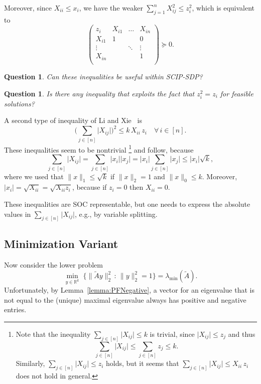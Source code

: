 \documentclass[10pt, a4paper]{article}
\newcommand{\suchthat}{\,:\,}
\newcommand{\abs}[1]{\lvert{#1}\rvert}
\newcommand{\norm}[1]{\lVert{#1}\rVert}
\newcommand{\Norm}[2]{\lVert{#1}\rVert_{#2}}
\newcommand{\R}{\mathds{R}}
\newtheorem{question}[theorem]{Question}
\begin{document}
Moreover, since $X_{ii} \leq x_i$, we have the weaker
$\sum_{j=1}^n X_{ij}^2 \leq z_i^2$, which is equivalent to
\[
  \begin{pmatrix}
    z_i & X_{i1} & \dots & X_{in} \\
    X_{i1} & 1 &  & 0 \\
    \vdots & & \ddots & \vdots \\
    X_{in} & &    & 1 \\
  \end{pmatrix}
  \succeq 0.
\]

\begin{question}
  Can these inequalities be useful within SCIP-SDP?
\end{question}

\begin{question}
  Is there any inequality that exploits the fact that $z_i^2 = z_i$ for
  feasible solutions?
\end{question}

A second type of inequality of Li and Xie~\cite{LiX20} is
\[
  \bigg(\sum_{j \in [n]} \abs{X_{ij}}\bigg)^2 \leq k\, X_{ii}\, z_i\quad
  \forall\, i \in [n].
\]
These inequalities seem to be nontrivial
\footnote{Note that the inequality $\sum_{j \in [n]} \abs{X_{ij}} \leq k$ is trivial,
since $\abs{X_{ij}} \leq z_j$ and thus
\[
  \sum_{j \in [n]} \abs{X_{ij}} \leq \sum_{j \in [n]} z_j \leq k.
\]
Similarly, $\sum_{j \in [n]} \abs{X_{ij}} \leq z_i$ holds, but it seems
that $\sum_{j \in [n]} \abs{X_{ij}} \leq X_{ii}\, z_i$ does not hold in general.}
and follow, because
\[
  \sum_{j \in [n]} \abs{X_{ij}} = \sum_{j \in [n]} \abs{x_i} \abs{x_j} =
  \abs{x_i} \sum_{j \in [n]} \abs{x_j} \leq \abs{x_i} \sqrt{k},
\]
where we used that $\norm{x}_1 \leq \sqrt{k}$ if $\norm{x}_2 = 1$ and
$\norm{x}_0 \leq k$. Moreover, $\abs{x_i} = \sqrt{X_{ii}} = \sqrt{X_{ii}
  z_i}$, because if $z_i = 0$ then $X_{ii} = 0$.

These inequalities are SOC representable, but one needs to express the
absolute values in $\sum_{j \in [n]} \abs{X_{ij}}$, e.g., by variable
splitting.

\subsection{Minimization Variant}

Now consider the lower problem
\[
  \min_{y \in \R^k} \; \{\Norm{\tilde{A}y}{2}^2 \suchthat \Norm{y}{2}^2 =
  1\} = \lambda_{\min}(\tilde{A}).
\]
Unfortunately, by Lemma~\ref{lemma:PFNegative}, a vector for an eigenvalue
that is not equal to the (unique) maximal eigenvalue always has positive
and negative entries.
\end{document}
